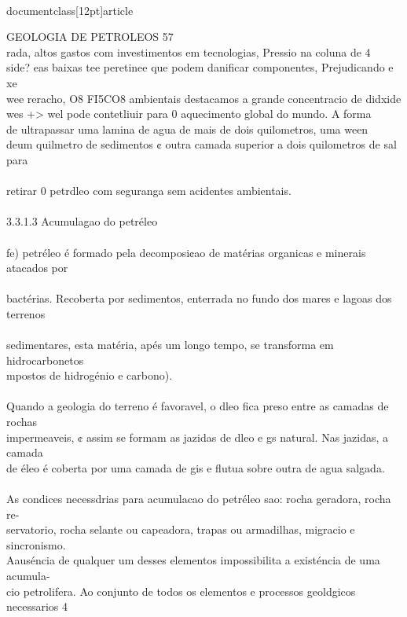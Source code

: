 \\documentclass[12pt]{article}
\begin{document}
{GEOLOGIA DE PETROLEOS 57\\
rada, altos gastos com investimentos em tecnologias, Pressio na coluna de 4\\
side? eas baixas tee peretinee que podem danificar componentes, Prejudicando e xe\\
wee reracho, O8 FI5CO8 ambientais destacamos a grande concentracio de didxide\\
wes +> wel pode contetliuir para 0 aquecimento global do mundo. A forma\\
de ultrapassar uma lamina de agua de mais de dois quilometros, uma ween\\
deum quilmetro de sedimentos ¢ outra camada superior a dois quilometros de sal para\\
\\
retirar 0 petrdleo com seguranga sem acidentes ambientais.\\
\\
3.3.1.3 Acumulagao do petréleo\\
\\
fe) petréleo é formado pela decomposi¢ao de matérias organicas e minerais atacados por\\
\\
bactérias. Recoberta por sedimentos, enterrada no fundo dos mares e lagoas dos terrenos\\
\\
sedimentares, esta matéria, apés um longo tempo, se transforma em hidrocarbonetos\\
mpostos de hidrogénio e carbono).\\
\\
Quando a geologia do terreno é favoravel, o dleo fica preso entre as camadas de rochas\\
impermeaveis, ¢ assim se formam as jazidas de dleo e gs natural. Nas jazidas, a camada\\
de éleo é coberta por uma camada de gis e flutua sobre outra de agua salgada.\\
\\
As condices necessdrias para acumulacao do petréleo sao: rocha geradora, rocha re-\\
servatorio, rocha selante ou capeadora, trapas ou armadilhas, migracio e sincronismo.\\
Aauséncia de qualquer um desses elementos impossibilita a existéncia de uma acumula-\\
cio petrolifera. Ao conjunto de todos os elementos e processos geoldgicos necessarios 4\\
}
\end{document}

